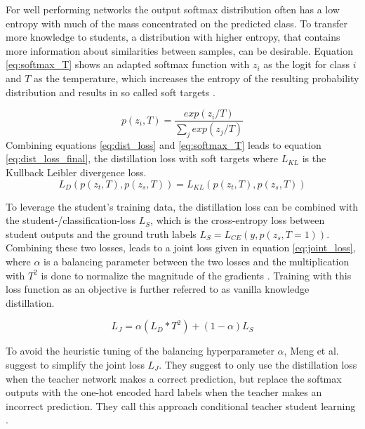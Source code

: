\documentclass[11pt]{article}
\begin{document}
For well performing networks the output softmax distribution often has a low entropy with much of the mass concentrated on the predicted class. To transfer more knowledge to students, a distribution with higher entropy, that contains more information about similarities between samples, can be desirable.
Equation \ref{eq:softmax_T} shows an adapted softmax function with $ z_i $ as the logit for class $ i $ and $ T $ as the temperature, which increases the entropy of the resulting probability distribution and results in so called soft targets \cite{hintonDistillingKnowledgeNeural2015}.

\begin{equation}
\label{eq:softmax_T}
p(z_i, T) = \frac{exp(z_i / T)}{\sum_{j}exp(z_j/ T)}
\end{equation}
Combining equations \ref{eq:dist_loss} and \ref{eq:softmax_T} leads to equation \ref{eq:dist_loss_final}, the distillation loss with soft targets where $ L_{KL} $ is the Kullback Leibler divergence loss.
\begin{equation}
\label{eq:dist_loss_final}
L_D(p(z_t, T), p(z_s, T)) = L_{KL}(p(z_t, T), p(z_s, T))
\end{equation}

To leverage the student's training data, the distillation loss can be combined with the student-/classification-loss $ L_S $, which is the cross-entropy loss between student outputs and the ground truth labels $ L_S = L_{CE}(y, p(z_s, T=1)) $. Combining these two losses, leads to a joint loss given in equation \ref{eq:joint_loss}, where $ \alpha $ is a balancing parameter between the two losses and the multiplication with $ T^2 $ is done to normalize the magnitude of the gradients \cite{hintonDistillingKnowledgeNeural2015}. Training with this loss function as an objective is further referred to as vanilla knowledge distillation.

\begin{equation}
\label{eq:joint_loss}
L_J = \alpha  (L_D * T^2) + (1 - \alpha) L_S
\end{equation}

To avoid the heuristic tuning of the balancing hyperparameter $ \alpha $, Meng et al. suggest to simplify the joint loss $ L_J $. They suggest to only use the distillation loss when the teacher network makes a correct prediction, but replace the softmax outputs with the one-hot encoded hard labels when the teacher makes an incorrect prediction. They call this approach conditional teacher student learning \cite{meng2019conditional}. 
\end{document}
